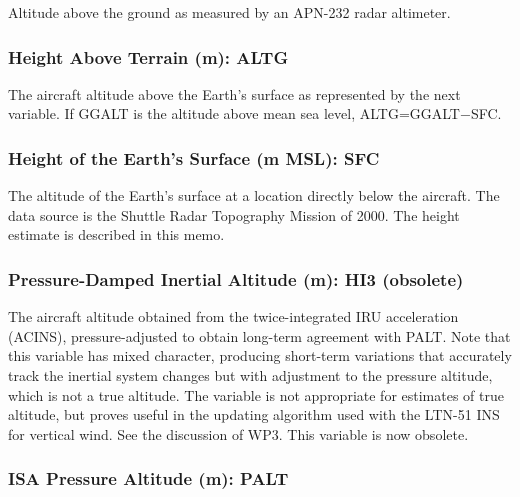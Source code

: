 \documentclass[
  english,
]{book}
\begin{document}
Altitude above the ground as measured by an APN-232 radar altimeter.

\hypertarget{altg}{%
\subsubsection*{Height Above Terrain (m): ALTG}\label{altg}}

The aircraft altitude above the Earth's surface as represented by the next variable. If GGALT is the altitude above mean sea level, ALTG=GGALT{−}SFC.

\hypertarget{sfc}{%
\subsubsection*{Height of the Earth's Surface (m MSL): SFC}\label{sfc}}

The altitude of the Earth's surface at a location directly below the aircraft. The data source is the Shuttle Radar Topography Mission of 2000. The height estimate is described in this memo.

\hypertarget{hi3}{%
\subsubsection*{Pressure-Damped Inertial Altitude (m): HI3 (obsolete)}\label{hi3}}

The aircraft altitude obtained from the twice-integrated IRU acceleration (ACINS), pressure-adjusted to obtain long-term agreement with PALT. Note that this variable has mixed character, producing short-term variations that accurately track the inertial system changes but with adjustment to the pressure altitude, which is not a true altitude. The variable is not appropriate for estimates of true altitude, but proves useful in the updating algorithm used with the LTN-51 INS for vertical wind. See the discussion of WP3. This variable is now obsolete.

\hypertarget{palt}{%
\subsubsection*{ISA Pressure Altitude (m): PALT}\label{palt}}
\end{document}

